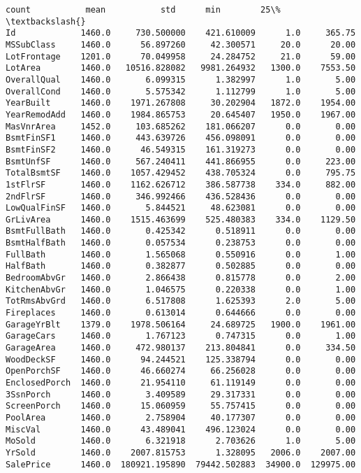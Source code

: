 \documentclass[11pt]{article}
\makeatletter
\newcommand{\boxspacing}{\kern\kvtcb@left@rule\kern\kvtcb@boxsep}
\newcommand{\prompt}[4]{
        {\ttfamily\llap{{\color{#2}[#3]:\hspace{3pt}#4}}\vspace{-\baselineskip}}
    }
\makeatother
\begin{document}
            \begin{tcolorbox}[breakable, size=fbox, boxrule=.5pt, pad at break*=1mm, opacityfill=0]
\prompt{Out}{outcolor}{4}{\boxspacing}
\begin{Verbatim}[commandchars=\\\{\}]
                count           mean           std      min        25\%  \textbackslash{}
Id             1460.0     730.500000    421.610009      1.0     365.75
MSSubClass     1460.0      56.897260     42.300571     20.0      20.00
LotFrontage    1201.0      70.049958     24.284752     21.0      59.00
LotArea        1460.0   10516.828082   9981.264932   1300.0    7553.50
OverallQual    1460.0       6.099315      1.382997      1.0       5.00
OverallCond    1460.0       5.575342      1.112799      1.0       5.00
YearBuilt      1460.0    1971.267808     30.202904   1872.0    1954.00
YearRemodAdd   1460.0    1984.865753     20.645407   1950.0    1967.00
MasVnrArea     1452.0     103.685262    181.066207      0.0       0.00
BsmtFinSF1     1460.0     443.639726    456.098091      0.0       0.00
BsmtFinSF2     1460.0      46.549315    161.319273      0.0       0.00
BsmtUnfSF      1460.0     567.240411    441.866955      0.0     223.00
TotalBsmtSF    1460.0    1057.429452    438.705324      0.0     795.75
1stFlrSF       1460.0    1162.626712    386.587738    334.0     882.00
2ndFlrSF       1460.0     346.992466    436.528436      0.0       0.00
LowQualFinSF   1460.0       5.844521     48.623081      0.0       0.00
GrLivArea      1460.0    1515.463699    525.480383    334.0    1129.50
BsmtFullBath   1460.0       0.425342      0.518911      0.0       0.00
BsmtHalfBath   1460.0       0.057534      0.238753      0.0       0.00
FullBath       1460.0       1.565068      0.550916      0.0       1.00
HalfBath       1460.0       0.382877      0.502885      0.0       0.00
BedroomAbvGr   1460.0       2.866438      0.815778      0.0       2.00
KitchenAbvGr   1460.0       1.046575      0.220338      0.0       1.00
TotRmsAbvGrd   1460.0       6.517808      1.625393      2.0       5.00
Fireplaces     1460.0       0.613014      0.644666      0.0       0.00
GarageYrBlt    1379.0    1978.506164     24.689725   1900.0    1961.00
GarageCars     1460.0       1.767123      0.747315      0.0       1.00
GarageArea     1460.0     472.980137    213.804841      0.0     334.50
WoodDeckSF     1460.0      94.244521    125.338794      0.0       0.00
OpenPorchSF    1460.0      46.660274     66.256028      0.0       0.00
EnclosedPorch  1460.0      21.954110     61.119149      0.0       0.00
3SsnPorch      1460.0       3.409589     29.317331      0.0       0.00
ScreenPorch    1460.0      15.060959     55.757415      0.0       0.00
PoolArea       1460.0       2.758904     40.177307      0.0       0.00
MiscVal        1460.0      43.489041    496.123024      0.0       0.00
MoSold         1460.0       6.321918      2.703626      1.0       5.00
YrSold         1460.0    2007.815753      1.328095   2006.0    2007.00
SalePrice      1460.0  180921.195890  79442.502883  34900.0  129975.00


\end{Verbatim}
\end{tcolorbox}
\end{document}
